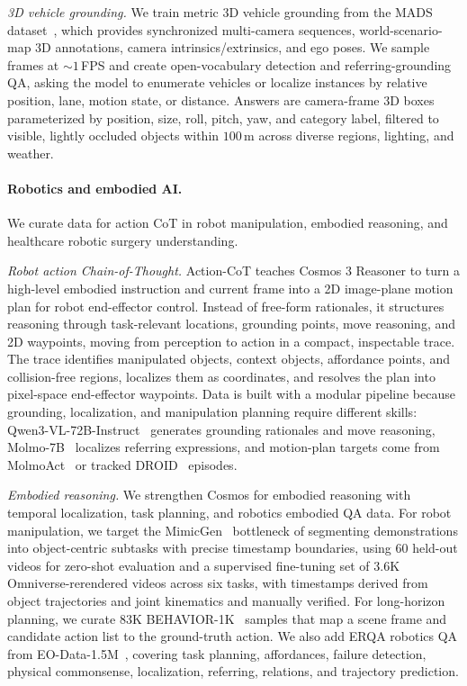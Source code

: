 \textit{3D vehicle grounding.} We train metric 3D vehicle grounding from the MADS dataset~\citep{ren2025cosmos}, which provides synchronized multi-camera sequences, world-scenario-map 3D annotations, camera intrinsics/extrinsics, and ego poses. We sample frames at ${\sim}1$\,FPS and create open-vocabulary detection and referring-grounding QA, asking the model to enumerate vehicles or localize instances by relative position, lane, motion state, or distance. Answers are camera-frame 3D boxes parameterized by position, size, roll, pitch, yaw, and category label, filtered to visible, lightly occluded objects within $100$\,m across diverse regions, lighting, and weather.

\paragraph{Robotics and embodied AI.} We curate data for action CoT in robot manipulation, embodied reasoning, and healthcare robotic surgery understanding.

\textit{Robot action Chain-of-Thought.} 
Action-CoT teaches Cosmos 3 Reasoner to turn a high-level embodied instruction and current frame into a 2D image-plane motion plan for robot end-effector control. Instead of free-form rationales, it structures reasoning through task-relevant locations, grounding points, move reasoning, and 2D waypoints, moving from perception to action in a compact, inspectable trace. The trace identifies manipulated objects, context objects, affordance points, and collision-free regions, localizes them as coordinates, and resolves the plan into pixel-space end-effector waypoints. Data is built with a modular pipeline because grounding, localization, and manipulation planning require different skills: Qwen3-VL-72B-Instruct~\citep{bai2025qwen3} generates grounding rationales and move reasoning, Molmo-7B~\citep{deitke2024molmo} localizes referring expressions, and motion-plan targets come from MolmoAct~\citep{lee2025molmoact} or tracked DROID~\citep{khazatsky2024droid} episodes. 

\textit{Embodied reasoning.} 
We strengthen Cosmos for embodied reasoning with temporal localization, task planning, and robotics embodied QA data. For robot manipulation, we target the MimicGen~\citep{mandlekar2023mimicgen} bottleneck of segmenting demonstrations into object-centric subtasks with precise timestamp boundaries, using 60 held-out videos for zero-shot evaluation and a supervised fine-tuning set of 3.6K Omniverse-rerendered videos across six tasks, with timestamps derived from object trajectories and joint kinematics and manually verified. For long-horizon planning, we curate 83K BEHAVIOR-1K~\citep{li2023behavior1k} samples that map a scene frame and candidate action list to the ground-truth action. We also add ERQA robotics QA from EO-Data-1.5M~\citep{eo1}, covering task planning, affordances, failure detection, physical commonsense, localization, referring, relations, and trajectory prediction.

